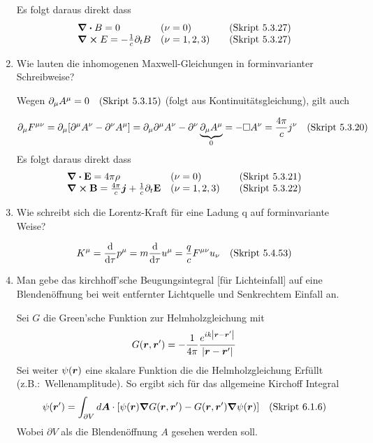 \begin{enumerate}
    Es folgt daraus direkt dass
    \begin{equation*}
      \begin{array}{lll}
        \div B = 0 & (\nu = 0) & \quad\text{(Skript 5.3.27)} \\
        \curl E = -\frac{1}{c}\partial_t B & (\nu = 1,2,3) 
                                           & \quad\text{(Skript 5.3.27)} 
      \end{array}
    \end{equation*}

  \item Wie lauten die inhomogenen Maxwell-Gleichungen in forminvarianter
    Schreibweise?

    Wegen $\partial_\mu A^\mu=0 \quad\text{(Skript 5.3.15)}$ 
    (folgt aus Kontinuitätsgleichung), gilt auch
    
    \begin{equation*}
      \partial_\mu F^{\mu\nu}
      =\partial_\mu\qty[\partial^\mu A^\nu-\partial^\nu A^\mu]
      =\partial_\mu\partial^\mu A^\nu - \partial^\nu 
      \underbrace{\partial_\mu A^\mu}_{0}
      =-\square A^\nu = \frac{4\pi}{c}j^\nu \quad\text{(Skript 5.3.20)} 
    \end{equation*}
    Es folgt daraus direkt dass
    \begin{equation*}
      \begin{array}{lll}
        \div \vb E = 4\pi \rho &(\nu=0) &\quad\text{(Skript 5.3.21)}\\
        \curl \vb B = \frac{4\pi}{c}\vb* j + \frac{1}{c}\partial_t \vb E
                    &(\nu=1,2,3) &\quad\text{(Skript 5.3.22)}
      \end{array}
    \end{equation*}

  \item Wie schreibt sich die Lorentz-Kraft für eine Ladung q auf
    forminvariante Weise?

    \begin{equation*}
      K^\mu=\dv \tau p^\mu =m \dv \tau u^\mu = \frac{q}{c} F^{\mu\nu}u_\nu
      \quad\text{(Skript 5.4.53)}
    \end{equation*}

  \clearpage
  \item Man gebe das kirchhoff'sche Beugungsintegral [für
    Lichteinfall] auf eine Blendenöffnung bei weit 
    entfernter Lichtquelle und Senkrechtem Einfall an.
    
    Sei $G$ die Green'sche Funktion zur Helmholzgleichung mit
    \begin{equation*}
      G(\vb* r, \vb* r')
      =-\frac{1}{4\pi}\frac{e^{ik\abs{\vb* r -\vb* r'}}}{\abs{\vb* r - \vb* r'}}
    \end{equation*}
    Sei weiter $\psi(\vb* r)$ eine skalare Funktion die die Helmholzgleichung
    Erfüllt (z.B.:\ Wellenamplitude).
    So ergibt sich für das allgemeine Kirchoff Integral
    \begin{equation*}
      \psi(\vb* r')=\int_{\partial V} d\vb* A 
      \cdot 
      \qty[\psi(\vb* r)\grad G(\vb* r, \vb* r')-
      G(\vb* r, \vb* r')\grad\psi(\vb* r)]
      \quad\text{(Skript 6.1.6)}
    \end{equation*}
    Wobei $\partial V$ als die Blendenöffnung $A$ gesehen werden soll.


\end{enumerate}
